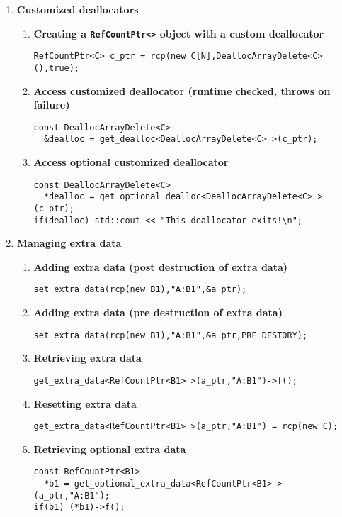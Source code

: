 \documentclass[pdf,ps2pdf,11pt]{SANDreport}
\begin{document}
\begin{enumerate}
\item {\bf Customized deallocators}
\label{rcpqs:apdx:qs:dealloc}
%
\begin{enumerate}
%
\item {\bf Creating a \texttt{RefCountPtr<>} object with a custom deallocator }
%
{\small\begin{verbatim}
RefCountPtr<C> c_ptr = rcp(new C[N],DeallocArrayDelete<C>(),true);
\end{verbatim}}
%
\item {\bf Access customized deallocator (runtime checked, throws on failure)}
%
{\small\begin{verbatim}
const DeallocArrayDelete<C>
  &dealloc = get_dealloc<DeallocArrayDelete<C> >(c_ptr);
\end{verbatim}}
%
\item {\bf Access optional customized deallocator}
%
{\small\begin{verbatim}
const DeallocArrayDelete<C>
  *dealloc = get_optional_dealloc<DeallocArrayDelete<C> >(c_ptr);
if(dealloc) std::cout << "This deallocator exits!\n";
\end{verbatim}}
%
\end{enumerate}

\item {\bf Managing extra data}
\label{rcpqs:apdx:qs:extra-data}
%
\begin{enumerate}
%
\item {\bf Adding extra data (post destruction of extra data)}
%
{\small\begin{verbatim}
set_extra_data(rcp(new B1),"A:B1",&a_ptr);
\end{verbatim}}
%
\item {\bf Adding extra data (pre destruction of extra data)}
%
{\small\begin{verbatim}
set_extra_data(rcp(new B1),"A:B1",&a_ptr,PRE_DESTORY);
\end{verbatim}}
%
\item {\bf Retrieving extra data}
%
{\small\begin{verbatim}
get_extra_data<RefCountPtr<B1> >(a_ptr,"A:B1")->f();
\end{verbatim}}
%
\item {\bf Resetting extra data}
%
{\small\begin{verbatim}
get_extra_data<RefCountPtr<B1> >(a_ptr,"A:B1") = rcp(new C);
\end{verbatim}}
%
\item {\bf Retrieving optional extra data}
%
{\small\begin{verbatim}
const RefCountPtr<B1>
  *b1 = get_optional_extra_data<RefCountPtr<B1> >(a_ptr,"A:B1");
if(b1) (*b1)->f();
\end{verbatim}}
%
\end{enumerate}

\end{enumerate}
\end{document}
